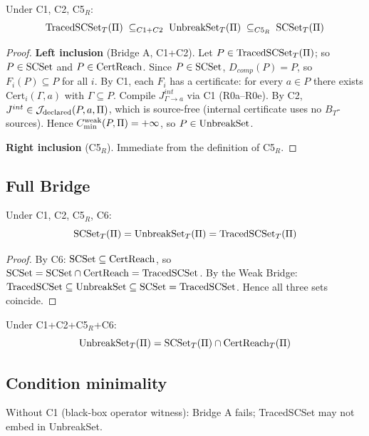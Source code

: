 \begin{theorem}\label{thm:weak-bridge}
Under C1, C2, C5$_R$:
$$\mathrm{TracedSCSet}_T(\Pi)\;\subseteq_{C1+C2}\;\mathrm{UnbreakSet}_T(\Pi)\;\subseteq_{C5_R}\;\mathrm{SCSet}_T(\Pi)$$
\end{theorem}

\begin{proof}
\textbf{Left inclusion} (Bridge A, C1+C2).
Let $P\in\mathrm{TracedSCSet}_T(\Pi)$; so $P\in\mathrm{SCSet}$ and $P\in\mathrm{CertReach}$.
Since $P\in\mathrm{SCSet}$, $D_{comp}(P)=P$, so $F_i(P)\subseteq P$ for all $i$.
By C1, each $F_i$ has a certificate: for every $a\in P$ there exists
$\mathrm{Cert}_i(\Gamma,a)$ with $\Gamma\subseteq P$.
Compile $J^{int}_{\Gamma\to a}$ via C1 (R0a--R0e).
By C2, $J^{int}\in\mathcal{J}_{\mathrm{declared}}(P,a,\Pi)$, which is source-free
(internal certificate uses no $B_T$-sources).
Hence $C_{\min}^{\mathrm{weak}}(P,\Pi)=+\infty$, so $P\in\mathrm{UnbreakSet}$.

\textbf{Right inclusion} (C5$_R$).
Immediate from the definition of C5$_R$.
\end{proof}

\subsection{Full Bridge}

\begin{theorem}\label{thm:full-bridge}
Under C1, C2, C5$_R$, C6:
$$\mathrm{SCSet}_T(\Pi) = \mathrm{UnbreakSet}_T(\Pi) = \mathrm{TracedSCSet}_T(\Pi)$$
\end{theorem}

\begin{proof}
By C6: $\mathrm{SCSet}\subseteq\mathrm{CertReach}$, so $\mathrm{SCSet}=\mathrm{SCSet}\cap\mathrm{CertReach}=\mathrm{TracedSCSet}$.
By the Weak Bridge: $\mathrm{TracedSCSet}\subseteq\mathrm{UnbreakSet}\subseteq\mathrm{SCSet}=\mathrm{TracedSCSet}$.
Hence all three sets coincide.
\end{proof}

\begin{corollary}
Under C1+C2+C5$_R$+C6:
$$\mathrm{UnbreakSet}_T(\Pi) = \mathrm{SCSet}_T(\Pi) \cap \mathrm{CertReach}_T(\Pi)$$
\end{corollary}

\subsection{Condition minimality}

\begin{proposition}[C1 necessary]
Without C1 (black-box operator witness): Bridge A fails; TracedSCSet
may not embed in UnbreakSet.
\end{proposition}

